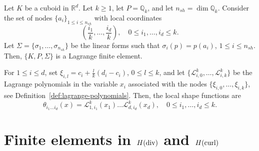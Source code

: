 \begin{lemma}\label{lemma:tensor_product_lagrange_fe}
    Let $K$ be a cuboid in $\mathbb{R}^d$. Let $k \ge 1$, let $P = \mathbb{Q}_k$, and let $n_{sh} = \dim \mathbb{Q}_k$. Consider the set of nodes $\{a_i\}_{1 \le i \le n_{sh}}$ with local coordinates
    \begin{equation}
        \left(\frac{i_1}{k}, \dots, \frac{i_d}{k}\right), \quad 0 \le i_1, \dots, i_d \le k.
    \end{equation}
    Let $\Sigma = \{\sigma_1, \dots, \sigma_{n_{sh}}\}$ be the linear forms such that $\sigma_i(p) = p(a_i)$, $1 \le i \le n_{sh}$. Then, $\{K, P, \Sigma\}$ is a Lagrange finite element.
\end{lemma}
For $1 \le i \le d$, set $\xi_{i,l} = c_i + \frac{l}{k}(d_i - c_i)$, $0 \le l \le k$, and let $\{\mathcal{L}_{i,0}^k, \dots, \mathcal{L}_{i,k}^k\}$ be the Lagrange polynomials in the variable $x_i$ associated with the nodes $\{\xi_{i,0}, \dots, \xi_{i,k}\}$, see Definition~\ref{def:lagrange-polynomials}. Then, the local shape functions are
\begin{equation*}
    \theta_{i_1 \dots i_d}(x) = \mathcal{L}_{1,i_1}^k(x_1) \dots \mathcal{L}_{d,i_d}^k(x_d), \quad 0 \le i_1, \dots, i_d \le k.
\end{equation*}

\section{\texorpdfstring{Finite elements in $H(\operatorname{\text{div}})$ and $H(\operatorname{\text{curl}})$}{Finite elements in H(div) and H(curl)}}\label{sec:finite-elements-Hdiv-Hcurl}

